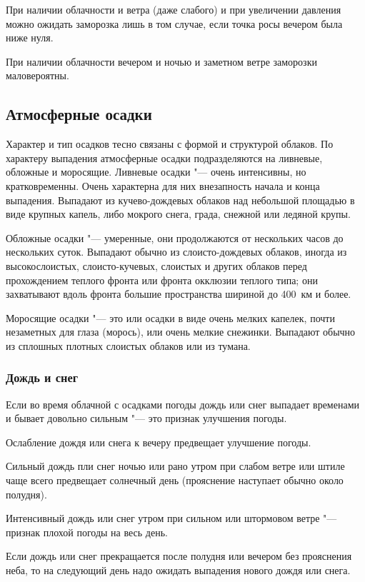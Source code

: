  При наличии облачности и ветра (даже слабого) и при увеличении
давления можно ожидать заморозка лишь в том случае, если точка росы
вечером была ниже нуля.

 При наличии облачности вечером и ночью и заметном ветре
заморозки маловероятны.

\subsection{Атмосферные осадки}

Характер и тип осадков тесно связаны с формой и структурой облаков. По
характеру выпадения атмосферные осадки подразделяются на ливневые,
обложные и моросящие. Ливневые осадки "--- очень интенсивны, но
кратковременны. Очень характерна для них внезапность начала и конца
выпадения. Выпадают из кучево-дождевых облаков над небольшой площадью
в виде крупных капель, либо мокрого снега, града, снежной или ледяной
крупы.

Обложные осадки "--- умеренные, они продолжаются от нескольких часов до
нескольких суток. Выпадают обычно из слоисто-дождевых облаков, иногда
из высокослоистых, слоисто-кучевых, слоистых и других облаков перед
прохождением теплого фронта или фронта окклюзии теплого типа; они
захватывают вдоль фронта большие пространства шириной до 400~км и
более.

Моросящие осадки "--- это или осадки в виде очень мелких капелек, почти
незаметных для глаза (морось), или очень мелкие снежинки. Выпадают
обычно из сплошных плотных слоистых облаков или из тумана.

\subsubsection{Дождь и снег}

 Если во время облачной с осадками погоды дождь или снег выпадает
временами и бывает довольно сильным "--- это признак улучшения погоды.

 Ослабление дождя или снега к вечеру предвещает улучшение погоды.

 Сильный дождь пли снег ночью или рано утром при слабом ветре
или штиле чаще всего предвещает солнечный день (прояснение наступает
обычно около полудня).

 Интенсивный дождь или снег утром при сильном или штормовом
ветре "--- признак плохой погоды на весь день.

 Если дождь или снег прекращается после полудня или вечером без
прояснения неба, то на следующий день надо ожидать выпадения нового
дождя или снега.

